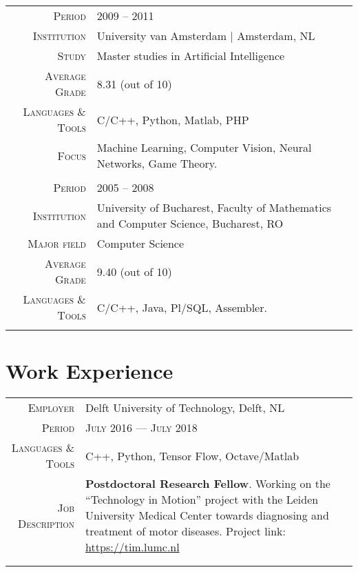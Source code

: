 \documentclass[a4paper, oneside, final]{scrartcl}
\newcommand{\gray}{\rowcolor[gray]{.90}}
\begin{document}
\begin{center}
\begin{tabular}{r@{\hskip 0.3in}p{11.3cm}}
			\gray \textsc{Period}       & \textsc{2009  -- 2011}\\
			\textsc{Institution}        & University van Amsterdam $\mid$ Amsterdam, NL\\
			\textsc{Study}              & Master studies in Artificial Intelligence\\
			\textsc{Average Grade}      & 8.31 (out of 10)\\
			\textsc{Languages \& Tools} & C\slash C++, Python, Matlab, PHP\\
			\textsc{Focus}              & Machine Learning, Computer Vision, Neural Networks, Game Theory.\\ 
			\multicolumn{2}{c}{}\\
	
			\gray \textsc{Period}       & \textsc{2005 -- 2008}\\
			\textsc{Institution}        & University of Bucharest, Faculty of Mathematics 
				and Computer Science, Bucharest, RO\\
			\textsc{Major field}        & Computer Science\\	
			\textsc{Average Grade}      & 9.40 (out of 10)\\
			\textsc{Languages \& Tools} & C\slash C++, Java, Pl\slash SQL, Assembler.\\ 
			\multicolumn{2}{c}{}\\
		\end{tabular}

		\section{Work Experience}
		\begin{tabular}{r@{\hskip 0.3in}p{11.3cm}}
			\gray \textsc{Employer}     & Delft University of Technology, Delft, NL\\
			\textsc{Period}             & \textsc{July 2016 --- July 2018} \\
			\textsc{Languages \& Tools} & C++, Python, Tensor Flow, Octave\slash Matlab\\
			\textsc{Job Description}    & \textbf{Postdoctoral Research Fellow}. 
				Working on the ``Technology in Motion'' project with the Leiden University Medical Center 
				towards diagnosing and treatment of motor diseases.
				Project link: \href{https://tim.lumc.nl}{https://tim.lumc.nl}\\
			\multicolumn{2}{c}{}\\
			\multicolumn{2}{c}{}\\ %


\end{tabular}
\end{center}
\end{document}
